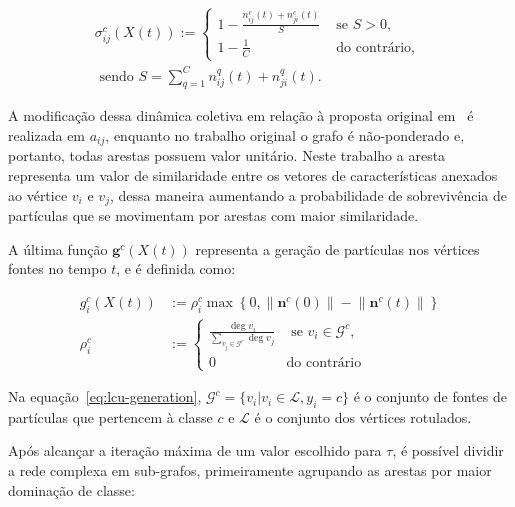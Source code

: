 \begin{equation}\label{eq:lcu-sigma}
\begin{aligned}
\sigma_{i j}^c(X(t)):= \begin{cases}1-\frac{n_{i j}^c(t)+n_{j i}^c(t)}{S} & \text { se } S>0, \\
1-\frac{1}{C} & \text { do contrário, }\end{cases} \\
\text { sendo } S=\sum_{q=1}^C n_{i j}^q(t)+n_{j i}^q(t) .
\end{aligned}
\end{equation}

A modificação dessa dinâmica coletiva em relação à proposta original
em~\cite{VerriNetworkUnfoldingMap2018} é realizada em $a_{ij}$,
enquanto no trabalho original o grafo é não-ponderado e, portanto, todas
arestas possuem valor unitário. Neste trabalho a aresta representa um
valor de similaridade entre os vetores de características anexados ao
vértice $v_i$ e $v_j$, dessa maneira aumentando a probabilidade de
sobrevivência de partículas que se movimentam por arestas com maior
similaridade.

A última função $\mathbf{g}^c(X(t))$ representa a geração de
partículas nos vértices fontes no tempo $t$, e é definida como:

\begin{equation}\label{eq:lcu-generation}
  \begin{aligned}
    g_i^c(X(t)) &:=\rho_i^c \max \left\{0, \lVert \mathbf{n}^c(0) \rVert - \lVert \mathbf{n}^c(t) \rVert\right\} \\
    \rho_i^c &:= \begin{cases}\frac{\deg v_i}{\sum_{v_j \in \mathcal{G}^c}
      \deg v_j} & \text { se } v_i \in \mathcal{G}^c, \\ 0 & \text {
                                                               do contrário }\end{cases}
  \end{aligned}
\end{equation}

Na equação~\ref{eq:lcu-generation}, $\mathcal{G}^c = \{v_i |v_i \in \mathcal{L}, y_i = c\}$
é o conjunto de fontes de partículas que pertencem à classe $c$ e $\mathcal{L}$
é o conjunto dos vértices rotulados.


Após alcançar a iteração máxima de um valor escolhido para $ \tau $, é possível
dividir a rede complexa em sub-grafos, primeiramente agrupando as
arestas por maior dominação de classe:


